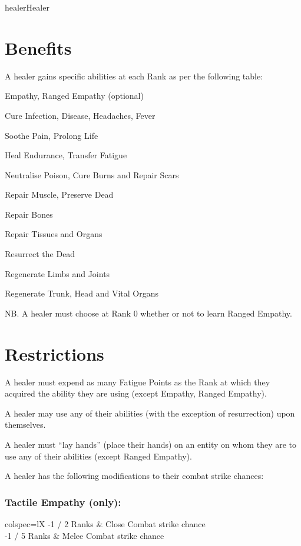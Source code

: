 \begin{Skill}[1.4]{healer}{Healer}
\section{Benefits}

A healer gains specific abilities at each Rank as per 
the following table: 
\begin{Enumerate}\setcounter{enumi}{-1}
\item Empathy, Ranged Empathy (optional) 
\item Cure Infection, Disease, Headaches, Fever 
\item Soothe Pain, Prolong Life 
\item Heal Endurance, Transfer Fatigue 
\item Neutralise Poison, Cure Burns and Repair Scars 
\item Repair Muscle, Preserve Dead 
\item Repair Bones 
\item Repair Tissues and Organs 
\item Resurrect the Dead 
\item Regenerate Limbs and Joints 
\item Regenerate Trunk, Head and Vital Organs 
\end{Enumerate}

NB.  A healer must choose at Rank 0 whether or not to learn Ranged
Empathy.

\section{Restrictions}

A healer must expend as many Fatigue Points as the Rank at which they
acquired the ability they are using (except Empathy, Ranged Empathy).

A healer may use any of their abilities (with the exception of
resurrection) upon themselves.

A healer must “lay hands” (place their hands) on an entity on whom
they are to use any of their abilities (except Ranged Empathy).

A healer has the following modifications to their combat strike
chances:

\subsubsection{Tactile Empathy (only):}

\begin{dqtblr}{colspec={lX}}
-1 / 2 Ranks	& Close Combat strike chance \\
-1 / 5 Ranks	& Melee Combat strike chance \\
\end{dqtblr}


\end{Skill}
